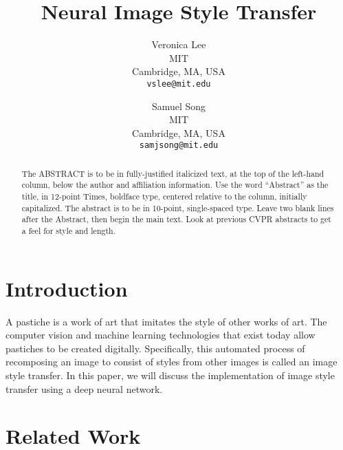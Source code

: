 \documentclass[10pt,twocolumn,letterpaper]{article}
\begin{document}
\title{Neural Image Style Transfer}

\author{Veronica Lee\\
MIT\\
Cambridge, MA, USA\\
{\tt\small vslee@mit.edu}
\and
Samuel Song\\
MIT\\
Cambridge, MA, USA\\
{\tt\small samjsong@mit.edu}
}

\maketitle

\begin{abstract}
   The ABSTRACT is to be in fully-justified italicized text, at the top
   of the left-hand column, below the author and affiliation
   information. Use the word ``Abstract'' as the title, in 12-point
   Times, boldface type, centered relative to the column, initially
   capitalized. The abstract is to be in 10-point, single-spaced type.
   Leave two blank lines after the Abstract, then begin the main text.
   Look at previous CVPR abstracts to get a feel for style and length.
\end{abstract}

\section{Introduction}

A pastiche is a work of art that imitates the style of other works of art. The computer vision and machine learning technologies that exist today allow pastiches to be created digitally. Specifically, this automated process of recomposing an image to consist of styles from other images is called an image style transfer. In this paper, we will discuss the implementation of image style transfer using a deep neural network. 

\section{Related Work}
\end{document}

